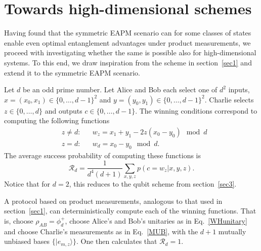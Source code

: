 \documentclass[aps,superscriptaddress,twocolumn,twoside,floatfix,pra,nofootinbib,a4paper]{revtex4-2}
\begin{document}
\section{Towards high-dimensional schemes}\label{sec4}
Having found that the symmetric EAPM scenario can for some classes of states enable even optimal entanglement advantages under product measurements, we proceed with investigating whether the same is possible also for high-dimensional systems. To this end, we draw inspiration from the scheme in section~\ref{sec1} and extend it to the symmetric EAPM scenario. 

Let $d$ be an odd prime number. Let Alice and Bob each select one of $d^2$ inputs, $x=(x_0,x_1)\in\{0,\ldots,d-1\}^2$ and $y=(y_0,y_1)\in\{0,\ldots,d-1\}^2$. Charlie selects $z\in\{0,\ldots,d\}$ and outputs $c\in\{0,\ldots,d-1\}$. The winning conditions correspond to computing the following functions
\begin{align}\nonumber
&z\neq d:  &&w_z=x_1+y_1-2z(x_0-y_0) \mod{d} \\\label{wincond3}
&z=d: && w_d=x_0-y_0\mod{d}.
\end{align}
The average success probability of computing these functions is
\begin{equation}
\mathcal{R}_d=\frac{1}{d^4(d+1)}\sum_{x,y,z}p(c=w_z|x,y,z). \label{RdsymEAPM}
\end{equation}
Notice that for $d=2$, this reduces to the qubit scheme from section~\ref{sec3}.

A protocol based on product measurements, analogous to that used in section~\ref{sec1}, can deterministically compute each of the winning functions. That is, choose $\rho_{AB}=\phi^+_d$, choose Alice's and Bob's unitaries as in Eq.~\eqref{WHunitary} and choose Charlie's measurements as in Eq.~\eqref{MUB}, with the $d+1$ mutually unbiased bases $\{\vert e_{m,z}\rangle\}$. One then calculates that $\mathcal{R}_d=1$. 
\end{document}
